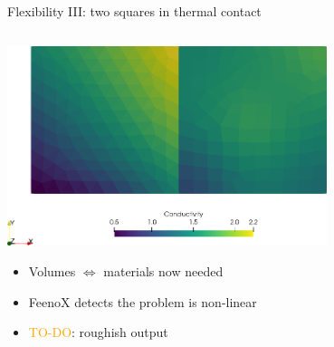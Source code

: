 \documentclass[
  ignorenonframetext,
  aspectratio=169,
]{beamer}
\providecommand{\tightlist}{%
  \setlength{\itemsep}{0pt}\setlength{\parskip}{0pt}}
\begin{document}
\begin{frame}[fragile]{Flexibility III: two squares in thermal contact}
\begin{columns}[T]
\begin{column}{0.5\textwidth}
\centering \includegraphics[width=0.7\textwidth,height=\textheight]{two-squares-conductivity.png}

\begin{itemize}
\tightlist
\item
  Volumes \(\Leftrightarrow\) materials now needed
\item
  FeenoX detects the problem is non-linear
\item
  \textcolor{Orange}{TO-DO}: roughish output
\end{itemize}
\end{column}
\end{columns}
\end{frame}
\end{document}
